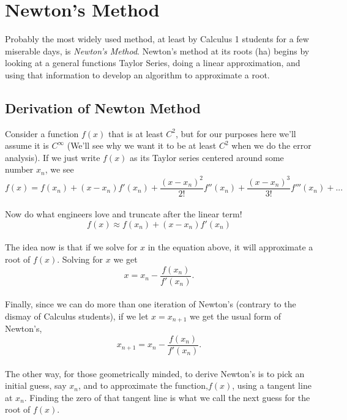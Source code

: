 \documentclass[paper=a4, fontsize=11pt]{scrartcl} %
\numberwithin{equation}{section} %
\numberwithin{figure}{section} %
\numberwithin{table}{section} %
\begin{document}
\section{Newton's Method}

Probably the most widely used method, at least by Calculus 1 students for a few miserable days, is \emph{Newton's Method}. Newton's method at its roots (ha) begins by looking at a general functions Taylor Series, doing a linear approximation, and using that information to develop an algorithm to approximate a root.\\

\subsection{Derivation of Newton Method}

Consider a function $f(x)$ that is at least $C^2$, but for our purposes here we'll assume it is $C^\infty$ (We'll see why we want it to be at least $C^2$ when we do the error analysis). If we just write $f(x)$ as its Taylor series centered around some number $x_n$, we see\\

$$f(x) = f(x_n) + (x-x_n) f'(x_n) + \frac{(x-x_n)^2}{2!} f''(x_n) + \frac{(x-x_n)^3}{3!} f'''(x_n) + ...$$\\

Now do what engineers love and truncate after the linear term! \\

$$f(x) \approx f(x_n) + (x-x_n) f'(x_n)$$\\

The idea now is that if we solve for $x$ in the equation above, it will approximate a root of $f(x)$. Solving for $x$ we get \\

$$x = x_n - \frac{ f(x_n) }{ f'(x_n) }.$$\\

Finally, since we can do more than one iteration of Newton's (contrary to the dismay of Calculus students), if we let $x=x_{n+1}$ we get the usual form of Newton's, \\

$$x_{n+1} = x_n - \frac{ f(x_n) }{ f'(x_n) }.$$\\

The other way, for those geometrically minded, to derive Newton's is to pick an initial guess, say $x_n$, and to approximate the function,$f(x)$, using a tangent line at $x_n$. Finding the zero of that tangent line is what we call the next guess for the root of $f(x)$.\\
\end{document}
